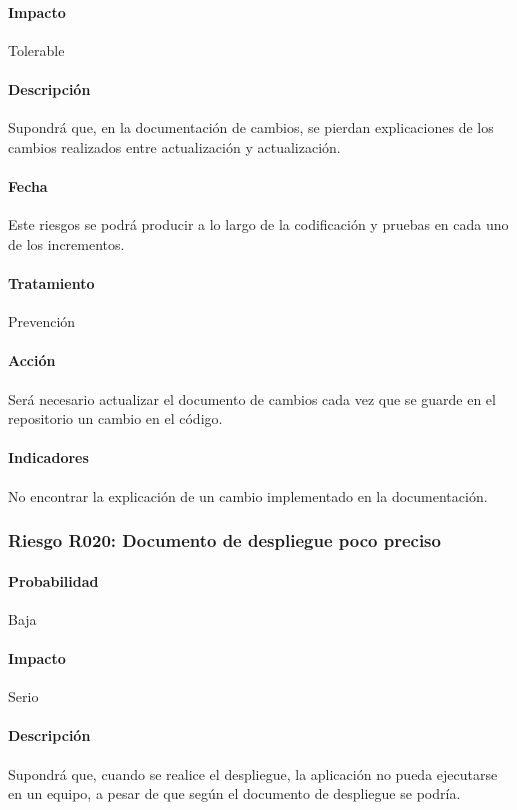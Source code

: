 \documentclass[10pt,a4paper]{article}
\begin{document}
				\paragraph{Impacto}	Tolerable
				\paragraph{Descripción} Supondrá que, en la documentación de cambios, se pierdan explicaciones de los cambios realizados entre actualización y actualización.
				\paragraph{Fecha} Este riesgos se podrá producir a lo largo de la codificación y pruebas en cada uno de los incrementos.  %
				\paragraph{Tratamiento} Prevención %
				\paragraph{Acción} Será necesario actualizar el documento de cambios cada vez que se guarde en el repositorio un cambio en el código. %
				\paragraph{Indicadores} No encontrar la explicación de un cambio implementado en la documentación. %
			
			\subsubsection{Riesgo R020: Documento de despliegue poco preciso }
				\paragraph{Probabilidad} Baja
				\paragraph{Impacto}	Serio
				\paragraph{Descripción} Supondrá que, cuando se realice el despliegue, la aplicación no pueda ejecutarse en un equipo, a pesar de que según el documento de despliegue se podría.
\end{document}
